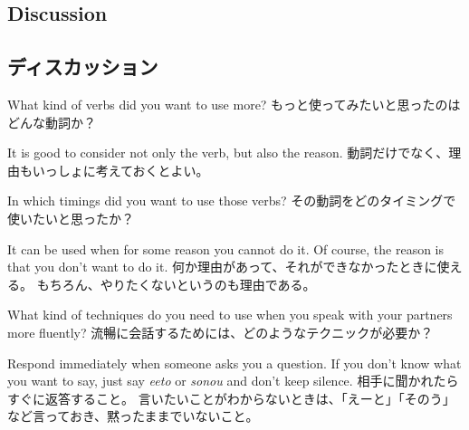 \documentclass[uplatex,dvipdfmx,b5paper,english,10pt]{jsbook}
\begin{document}
\ifEnglish
\subsection{Discussion}
\else
\subsection{ディスカッション}
\fi

\begin{toiquestion}
\ifEnglish
What kind of verbs did you want to use more?
\else
もっと使ってみたいと思ったのはどんな動詞か？
\fi
\end{toiquestion}
\begin{toianswer}
\ifEnglish
It is good to consider not only the verb, but also the reason.
\else
動詞だけでなく、理由もいっしょに考えておくとよい。
\fi
\end{toianswer}

\begin{toiquestion}
\ifEnglish
In which timings did you want to use those verbs?
\else
その動詞をどのタイミングで使いたいと思ったか？
\fi
\end{toiquestion}
\begin{toianswer}
\ifEnglish
It can be used when for some reason you cannot do it.
Of course, the reason is that you don't want to do it.
\else
何か理由があって、それができなかったときに使える。
もちろん、やりたくないというのも理由である。
\fi
\end{toianswer}


\begin{toiquestion}
\ifEnglish
What kind of techniques do you need to use when you speak with your partners more fluently?
\else
流暢に会話するためには、どのようなテクニックが必要か？
\fi
\end{toiquestion}
\begin{toianswer}
\ifEnglish
Respond immediately when someone asks you a question.
If you don't know what you want to say, just say {\it eeto\/} or {\it sonou\/} and don't keep silence.
\else
相手に聞かれたらすぐに返答すること。
言いたいことがわからないときは、「えーと」「そのう」など言っておき、黙ったままでいないこと。
\fi
\end{toianswer}


%
%
\end{document}

